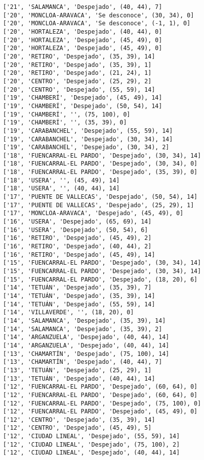\documentclass[11pt]{article}
\begin{document}
\begin{Verbatim}[commandchars=\\\{\}]
['21', 'SALAMANCA', 'Despejado', (40, 44), 7]
['20', 'MONCLOA-ARAVACA', 'Se desconoce', (30, 34), 0]
['20', 'MONCLOA-ARAVACA', 'Se desconoce', (-1, 1), 0]
['20', 'HORTALEZA', 'Despejado', (40, 44), 0]
['20', 'HORTALEZA', 'Despejado', (45, 49), 0]
['20', 'HORTALEZA', 'Despejado', (45, 49), 0]
['20', 'RETIRO', 'Despejado', (35, 39), 14]
['20', 'RETIRO', 'Despejado', (35, 39), 1]
['20', 'RETIRO', 'Despejado', (21, 24), 1]
['20', 'CENTRO', 'Despejado', (25, 29), 2]
['20', 'CENTRO', 'Despejado', (55, 59), 14]
['19', 'CHAMBERÍ', 'Despejado', (45, 49), 14]
['19', 'CHAMBERÍ', 'Despejado', (50, 54), 14]
['19', 'CHAMBERÍ', '', (75, 100), 0]
['19', 'CHAMBERÍ', '', (35, 39), 0]
['19', 'CARABANCHEL', 'Despejado', (55, 59), 14]
['19', 'CARABANCHEL', 'Despejado', (30, 34), 14]
['19', 'CARABANCHEL', 'Despejado', (30, 34), 2]
['18', 'FUENCARRAL-EL PARDO', 'Despejado', (30, 34), 14]
['18', 'FUENCARRAL-EL PARDO', 'Despejado', (30, 34), 0]
['18', 'FUENCARRAL-EL PARDO', 'Despejado', (35, 39), 0]
['18', 'USERA', '', (45, 49), 14]
['18', 'USERA', '', (40, 44), 14]
['17', 'PUENTE DE VALLECAS', 'Despejado', (50, 54), 14]
['17', 'PUENTE DE VALLECAS', 'Despejado', (25, 29), 1]
['17', 'MONCLOA-ARAVACA', 'Despejado', (45, 49), 0]
['16', 'USERA', 'Despejado', (65, 69), 14]
['16', 'USERA', 'Despejado', (50, 54), 6]
['16', 'RETIRO', 'Despejado', (45, 49), 2]
['16', 'RETIRO', 'Despejado', (40, 44), 2]
['16', 'RETIRO', 'Despejado', (45, 49), 14]
['15', 'FUENCARRAL-EL PARDO', 'Despejado', (30, 34), 14]
['15', 'FUENCARRAL-EL PARDO', 'Despejado', (30, 34), 14]
['15', 'FUENCARRAL-EL PARDO', 'Despejado', (18, 20), 6]
['14', 'TETUÁN', 'Despejado', (35, 39), 7]
['14', 'TETUÁN', 'Despejado', (35, 39), 14]
['14', 'TETUÁN', 'Despejado', (55, 59), 14]
['14', 'VILLAVERDE', '', (18, 20), 0]
['14', 'SALAMANCA', 'Despejado', (35, 39), 14]
['14', 'SALAMANCA', 'Despejado', (35, 39), 2]
['14', 'ARGANZUELA', 'Despejado', (40, 44), 14]
['14', 'ARGANZUELA', 'Despejado', (40, 44), 14]
['13', 'CHAMARTÍN', 'Despejado', (75, 100), 14]
['13', 'CHAMARTÍN', 'Despejado', (40, 44), 7]
['13', 'TETUÁN', 'Despejado', (25, 29), 1]
['13', 'TETUÁN', 'Despejado', (40, 44), 14]
['12', 'FUENCARRAL-EL PARDO', 'Despejado', (60, 64), 0]
['12', 'FUENCARRAL-EL PARDO', 'Despejado', (60, 64), 0]
['12', 'FUENCARRAL-EL PARDO', 'Despejado', (75, 100), 0]
['12', 'FUENCARRAL-EL PARDO', 'Despejado', (45, 49), 0]
['12', 'CENTRO', 'Despejado', (35, 39), 14]
['12', 'CENTRO', 'Despejado', (45, 49), 5]
['12', 'CIUDAD LINEAL', 'Despejado', (55, 59), 14]
['12', 'CIUDAD LINEAL', 'Despejado', (75, 100), 2]
['12', 'CIUDAD LINEAL', 'Despejado', (40, 44), 14]

\end{Verbatim}
\end{document}
